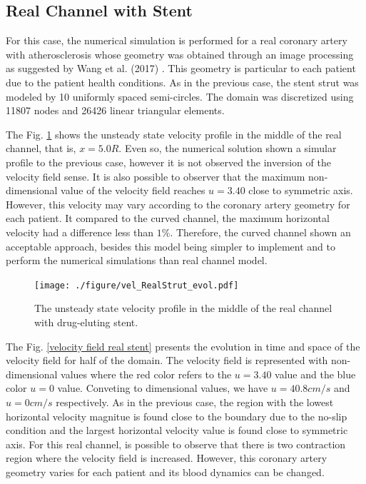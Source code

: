 \documentclass[10pt,fleqn,a4paper,twoside]{article}
\begin{document}
\subsection{Real Channel with Stent} \label{canal real com stent}

For this case, the numerical simulation is performed for a real 
coronary artery with atherosclerosis whose geometry was obtained 
through an image processing as suggested by Wang et al. (2017) 
\cite{wang2017}. This geometry is particular to each patient 
due to the patient health conditions. As in the previous case, 
the stent strut was modeled by
10 uniformly spaced semi-circles.
The domain was discretized using 11807 nodes and 26426 linear 
triangular elements. 

\medskip
The Fig. \ref{velocity evolution real stent}  shows the unsteady state velocity 
profile in the middle of the real channel, that is,
$x=5.0R$.
Even so, the numerical solution shown a simular
profile to the previous case,
however it is not observed the inversion of the velocity field sense. 
It is also possible to observer that
the maximum non-dimensional value of the velocity field 
reaches $u=3.40$ close to symmetric axis. 
However, this velocity may vary according to the 
coronary artery geometry for each patient.
It compared to the curved channel, the maximum horizontal velocity
had a difference less than $1\%$. Therefore, the curved channel
shown an acceptable approach,
besides this model being simpler to implement
and to perform the numerical simulations than real channel model.

\vspace{1cm}
\begin{figure}[H]
     \centering
     \texttt{[image: ./figure/vel\_RealStrut\_evol.pdf]}\\
     \label{velocity evolution real stent}
     \caption{
The unsteady state velocity profile in the middle of the real channel with drug-eluting stent.}
\end{figure}

\medskip
The Fig. \ref{velocity field real stent}  presents the evolution in 
time and space of the velocity field for half of the domain. 
The velocity field is represented with non-dimensional values 
where the red color refers to the $u=3.40$ value and the blue color 
$u=0$ value. Conveting to dimensional values, 
we have $u=40.8cm/s$ and $u=0cm/s$ respectively. As in the previous case,
the region with the lowest horizontal velocity magnitue is found close to
the boundary due to the no-slip
condition and the largest horizontal
velocity value is found close to
symmetric axis. For this real channel, is possible to observe that
there is two contraction region where
the velocity field is increased.
However, this coronary artery geometry varies for each patient and its blood dynamics can be changed.
\end{document}
